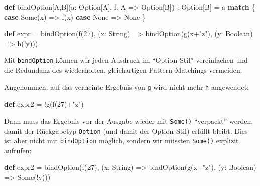 \documentclass[]{article}
\newenvironment{Shaded}{}{}
\newcommand{\DecValTok}[1]{\textcolor[rgb]{0.25,0.63,0.44}{#1}}
\newcommand{\FunctionTok}[1]{\textcolor[rgb]{0.02,0.16,0.49}{#1}}
\newcommand{\KeywordTok}[1]{\textcolor[rgb]{0.00,0.44,0.13}{\textbf{#1}}}
\newcommand{\NormalTok}[1]{#1}
\newcommand{\StringTok}[1]{\textcolor[rgb]{0.25,0.44,0.63}{#1}}
\begin{document}
\begin{Shaded}
\begin{Highlighting}[]
\KeywordTok{def}\NormalTok{ bindOption[A,B](a: Option[A], f: A =\textgreater{} Option[B]) : Option[B] = a }\KeywordTok{match}\NormalTok{ \{}
  \KeywordTok{case}\NormalTok{ Some(x) =\textgreater{} }\FunctionTok{f}\NormalTok{(x)}
  \KeywordTok{case}\NormalTok{ None =\textgreater{} None}
\NormalTok{\}}

\KeywordTok{def}\NormalTok{ expr = }
  \FunctionTok{bindOption}\NormalTok{(}\FunctionTok{f}\NormalTok{(}\DecValTok{27}\NormalTok{), (x: String) =\textgreater{} }
    \FunctionTok{bindOption}\NormalTok{(}\FunctionTok{g}\NormalTok{(x+}\StringTok{"z"}\NormalTok{), (y: Boolean) =\textgreater{}}
      \FunctionTok{h}\NormalTok{(!y)))}
\end{Highlighting}
\end{Shaded}

Mit \texttt{bindOption} können wir jeden Ausdruck im ``Option-Stil''
vereinfachen und die Redundanz des wiederholten, gleichartigen
Pattern-Matchings vermeiden.

Angenommen, auf das verneinte Ergebnis von \texttt{g} wird nicht mehr
\texttt{h} angewendet:

\begin{Shaded}
\begin{Highlighting}[]
\KeywordTok{def}\NormalTok{ expr2 = !}\FunctionTok{g}\NormalTok{(}\FunctionTok{f}\NormalTok{(}\DecValTok{27}\NormalTok{)+}\StringTok{"z"}\NormalTok{)}
\end{Highlighting}
\end{Shaded}

Dann muss das Ergebnis vor der Ausgabe wieder mit \texttt{Some()}
``verpackt'' werden, damit der Rückgabetyp \texttt{Option} (und damit
der Option-Stil) erfüllt bleibt. Dies ist aber nicht mit
\texttt{bindOption} möglich, sondern wir müssten \texttt{Some()}
explizit aufrufen:

\begin{Shaded}
\begin{Highlighting}[]
\KeywordTok{def}\NormalTok{ expr2 =}
  \FunctionTok{bindOption}\NormalTok{(}\FunctionTok{f}\NormalTok{(}\DecValTok{27}\NormalTok{), (x: String) =\textgreater{}}
    \FunctionTok{bindOption}\NormalTok{(}\FunctionTok{g}\NormalTok{(x+}\StringTok{"z"}\NormalTok{), (y: Boolean) =\textgreater{}}
\NormalTok{      Some(!y)))}
\end{Highlighting}
\end{Shaded}
\end{document}
